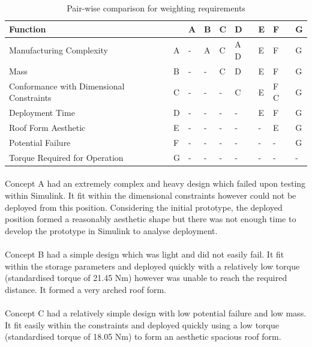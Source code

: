 \documentclass[a4paper]{article}
\begin{document}
\begin{table}[H]
\caption{Pair-wise comparison for weighting requirements}
\label{PWC}
\begin{tabular}{||l|l||l|l|l|l|l|l|l||}
\hline
Function &  & \multicolumn{1}{l|}{A} & \multicolumn{1}{l|}{B} & \multicolumn{1}{l|}{C} & \multicolumn{1}{l|}{D} & \multicolumn{1}{l|}{E} & \multicolumn{1}{l|}{F} & G \\ \hline\hline
Manufacturing Complexity & A & - & A & C & A D & E & F & G \\ \cline{1-2}
Mass & B & - & - & C & D & E & F & G \\ \cline{1-2}
Conformance with Dimensional Constraints & C & - & - & - & C & E & F C & G \\ \cline{1-2}
Deployment Time & D & - & - & - & - & E & F & G \\ \cline{1-2}
Roof Form Aesthetic & E & - & - & - & - & - & E & G \\ \cline{1-2}
Potential Failure & F & - & - & - & - & - & - & G \\ \cline{1-2}
Torque Required for Operation & G & - & - & - & - & - & - & - \\ \hline\hline
\end{tabular}
\end{table}

\paragraph{}
Concept A had an extremely complex and heavy design which failed upon testing within Simulink. It fit within the dimensional constraints however could not be deployed from this position. Considering the initial prototype, the deployed position formed a reasonably aesthetic shape but there was not enough time to develop the prototype in Simulink to analyse deployment.

\paragraph{}
Concept B had a simple design which was light and did not easily fail. It fit within the storage parameters and deployed quickly with a relatively low torque (standardised torque of 21.45 Nm) however was unable to reach the required distance. It formed a very arched roof form.

\paragraph{}
Concept C had a relatively simple design with low potential failure and low mass. It fit easily within the constraints and deployed quickly using a low torque (standardised torque of 18.05 Nm) to form an aesthetic spacious roof form. 
\end{document}
